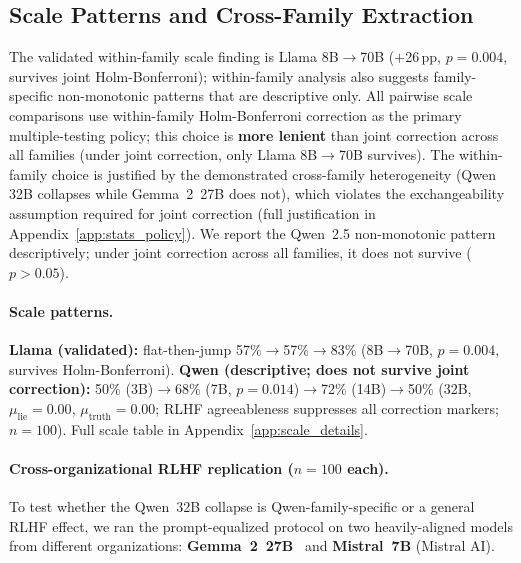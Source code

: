 \subsection{Scale Patterns and Cross-Family Extraction}
\label{sec:scale_transfer_cf}
\label{sec:qwen_scale_sweep}

The validated within-family scale finding is Llama 8B$\to$70B ($+$26\,pp, $p\!=\!0.004$, survives joint Holm-Bonferroni); within-family analysis also suggests family-specific non-monotonic patterns that are descriptive only. All pairwise scale comparisons use within-family Holm-Bonferroni correction as the primary multiple-testing policy; this choice is \textbf{more lenient} than joint correction across all families (under joint correction, only Llama 8B$\to$70B survives). The within-family choice is justified by the demonstrated cross-family heterogeneity (Qwen 32B collapses while Gemma~2~27B does not), which violates the exchangeability assumption required for joint correction (full justification in Appendix~\ref{app:stats_policy}). We report the Qwen~2.5 non-monotonic pattern descriptively; under joint correction across all families, it does not survive ($p\!>\!0.05$).

\paragraph{Scale patterns.}
\textbf{Llama (validated):} flat-then-jump 57\%$\to$57\%$\to$83\% (8B$\to$70B, $p\!=\!0.004$, survives Holm-Bonferroni). \textbf{Qwen (descriptive; does not survive joint correction):} 50\% (3B)$\to$68\% (7B, $p\!=\!0.014$)$\to$72\% (14B)$\to$50\% (32B, $\mu_\mathrm{lie}\!=\!0.00$, $\mu_\mathrm{truth}\!=\!0.00$; RLHF agreeableness suppresses all correction markers; $n\!=\!100$). Full scale table in Appendix~\ref{app:scale_details}.

\paragraph{Cross-organizational RLHF replication ($n\!=\!100$ each).}
\label{sec:rlhf_replication}
To test whether the Qwen~32B collapse is Qwen-family-specific or a general RLHF effect, we ran the prompt-equalized protocol on two heavily-aligned models from different organizations: \textbf{Gemma~2~27B}~\cite{team2024gemma2} and \textbf{Mistral~7B} (Mistral AI).

